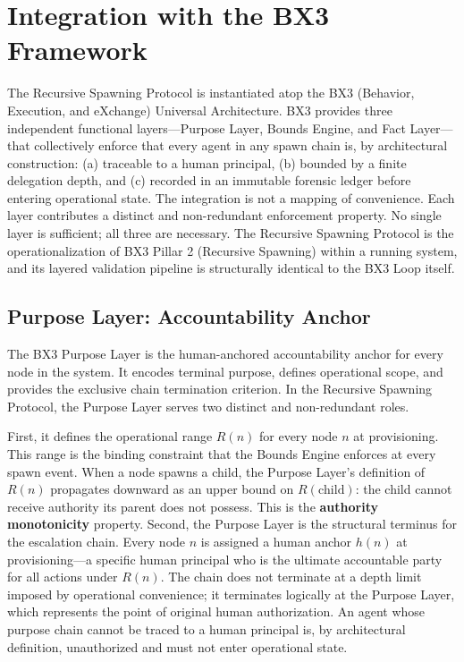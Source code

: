 \section{Integration with the BX3 Framework}
\label{sec:bx3-integration}

The Recursive Spawning Protocol is instantiated atop the BX3 (Behavior, Execution, and eXchange) Universal Architecture. BX3 provides three independent functional layers---Purpose Layer, Bounds Engine, and Fact Layer---that collectively enforce that every agent in any spawn chain is, by architectural construction: (a) traceable to a human principal, (b) bounded by a finite delegation depth, and (c) recorded in an immutable forensic ledger before entering operational state. The integration is not a mapping of convenience. Each layer contributes a distinct and non-redundant enforcement property. No single layer is sufficient; all three are necessary. The Recursive Spawning Protocol is the operationalization of BX3 Pillar 2 (Recursive Spawning) within a running system, and its layered validation pipeline is structurally identical to the BX3 Loop itself.

\subsection{Purpose Layer: Accountability Anchor}

The BX3 Purpose Layer is the human-anchored accountability anchor for every node in the system. It encodes terminal purpose, defines operational scope, and provides the exclusive chain termination criterion. In the Recursive Spawning Protocol, the Purpose Layer serves two distinct and non-redundant roles.

First, it defines the operational range $R(n)$ for every node $n$ at provisioning. This range is the binding constraint that the Bounds Engine enforces at every spawn event. When a node spawns a child, the Purpose Layer's definition of $R(n)$ propagates downward as an upper bound on $R(\text{child})$: the child cannot receive authority its parent does not possess. This is the \textbf{authority monotonicity} property. Second, the Purpose Layer is the structural terminus for the escalation chain. Every node $n$ is assigned a human anchor $h(n)$ at provisioning---a specific human principal who is the ultimate accountable party for all actions under $R(n)$. The chain does not terminate at a depth limit imposed by operational convenience; it terminates logically at the Purpose Layer, which represents the point of original human authorization. An agent whose purpose chain cannot be traced to a human principal is, by architectural definition, unauthorized and must not enter operational state.


